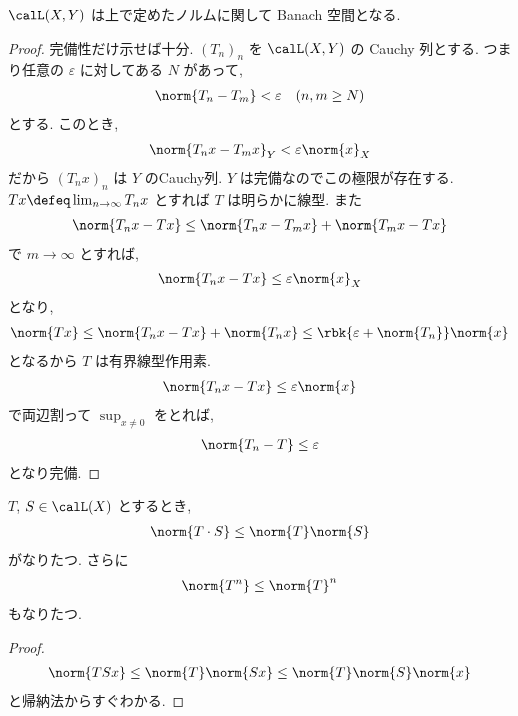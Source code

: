 \documentclass[openany, a4paper, oneside]{jsbook}
\begin{document}
\begin{thm}
$\calL (X, Y)$ は上で定めたノルムに関して Banach 空間となる.
\end{thm}
\begin{proof}
完備性だけ示せば十分.
$(T_n)_n$ を $\calL (X, Y)$ の Cauchy 列とする.
つまり任意の $\varepsilon$ に対してある $N$ があって,
\begin{align}
 \norm{T_n - T_m}
 <
 \varepsilon \quad (n, m \geq N)
\end{align}
とする.
このとき,
\begin{align}
 \norm{T_n x - T_m x}_Y
 <
 \varepsilon \norm{x}_X
\end{align}
だから $(T_nx)_n$ は $Y$ のCauchy列.
$Y$ は完備なのでこの極限が存在する.
$Tx \defeq \lim_{n \to \infty} T_nx$ とすれば $T$ は明らかに線型.
また
\begin{align}
 \norm{T_n x - Tx}
 \leq
 \norm{T_n x - T_m x} + \norm{T_m x - T x}
\end{align}
で $m \to \infty$ とすれば,
\begin{align}
 \norm{T_n x - T x}
 \leq
 \varepsilon \norm{x}_X
\end{align}
となり,
\begin{align}
 \norm{Tx}
 \leq
 \norm{T_n x - T x} + \norm{T_n x}
 \leq
 \rbk{\varepsilon + \norm{T_n}} \norm{x}
\end{align}
となるから $T$ は有界線型作用素.
\begin{align}
 \norm{T_n x - Tx}
 \leq
 \varepsilon \norm{x}
\end{align}
で両辺割って $\sup_{x \neq 0}$ をとれば,
\begin{align}
 \norm{T_n - T}
 \leq
 \varepsilon
\end{align}
となり完備.
\end{proof}

\begin{prop}
$T$, $S \in \calL (X)$ とするとき,
\begin{align}
 \norm{T \cdot S}
 \leq
 \norm{T} \norm{S}
\end{align}
がなりたつ.
さらに
\begin{align}
 \norm{T^n}
 \leq
 \norm{T}^n
\end{align}
もなりたつ.
\end{prop}
\begin{proof}
\begin{align}
 \norm{TS x}
 \leq
 \norm{T} \norm{Sx}
 \leq
 \norm{T} \norm{S} \norm{x}
\end{align}
と帰納法からすぐわかる.
\end{proof}
\end{document}
